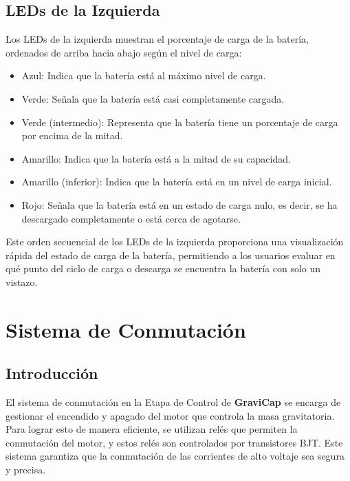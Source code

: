             \subsection{LEDs de la Izquierda}
                Los LEDs de la izquierda muestran el porcentaje de carga de la batería, ordenados de arriba hacia abajo según el nivel de carga:\par
                \begin{itemize} [label=•]
                    \setlength{\itemindent}{1.5em}
                    
                    \item Azul: Indica que la batería está al máximo nivel de carga.
                    \item Verde: Señala que la batería está casi completamente cargada.
                    \item Verde (intermedio): Representa que la batería tiene un porcentaje de carga por encima de la mitad.
                    \item Amarillo: Indica que la batería está a la mitad de su capacidad.
                    \item Amarillo (inferior): Indica que la batería está en un nivel de carga inicial.
                    \item Rojo: Señala que la batería está en un estado de carga nulo, es decir, se ha descargado completamente o está cerca de agotarse.
                \end{itemize}
                
                 Este orden secuencial de los LEDs de la izquierda proporciona una visualización rápida del estado de carga de la batería, permitiendo a los usuarios evaluar en qué punto del ciclo de carga o descarga se encuentra la batería con solo un vistazo.\par

        \section{Sistema de Conmutación}
        
            \subsection{Introducción}
                El sistema de conmutación en la Etapa de Control de \textcolor{dark_violet}{\textbf{GraviCap}} se encarga de gestionar el encendido y apagado del motor que controla la masa gravitatoria. Para lograr esto de manera eficiente, se utilizan relés que permiten la conmutación del motor, y estos relés son controlados por transistores BJT. Este sistema garantiza que la conmutación de las corrientes de alto voltaje sea segura y precisa.\par
                
